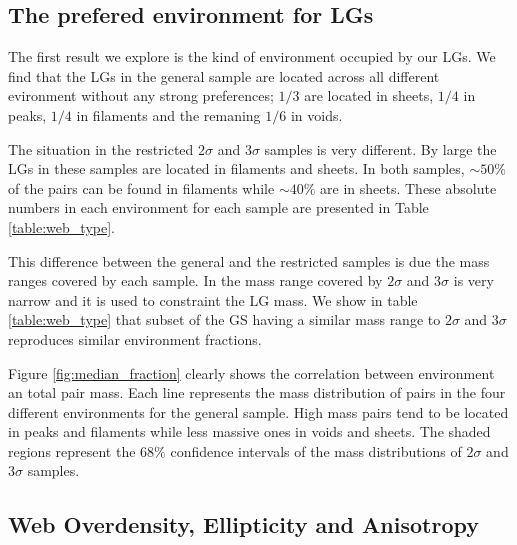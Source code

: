 \documentclass{emulateapj}
\begin{document}


\subsection{The prefered environment for LGs}

The first result we explore is the kind of environment occupied by
our LGs. 
We find that the LGs in the general sample are located across
all different evironment without any strong preferences; $1/3$  are
located in sheets, $1/4$ in peaks, $1/4$ in filaments and the remaning
$1/6$ in voids. 

The situation in the restricted $2\sigma$ and $3\sigma$ samples is very
different. 
By large the LGs in these samples are located in filaments and sheets. 
In both samples, $\sim 50\%$ of the pairs can be found in filaments
while $\sim 40\%$ are in sheets. 
These absolute numbers in each environment for each sample are
presented in Table \ref{table:web_type}.  

This difference between the general and the restricted samples is
due the mass ranges covered by each sample. 
In \citet{lganalogues} the mass range covered by $2\sigma$ and $3\sigma$ 
is very narrow and it is used to constraint the LG mass.
We show  in table \ref{table:web_type} that subset of the GS
having a similar mass range to $2\sigma$ and $3\sigma$ reproduces  
similar environment fractions.

Figure \ref{fig:median_fraction} clearly shows the correlation between
environment an total pair mass.
Each line represents the mass distribution of pairs in the four
different environments for the general sample.
High mass pairs tend to be located in  peaks and filaments while less
massive ones in voids and sheets. 
The shaded regions represent the $68\%$ confidence intervals of the mass 
distributions of $2\sigma$ and $3\sigma$ samples.



\subsection{Web Overdensity, Ellipticity and Anisotropy}
\end{document}
